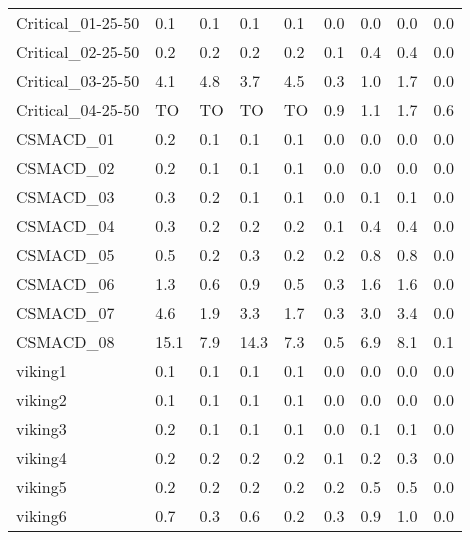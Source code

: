 \begin{table}
\begin{adjustbox}{max totalheight=\textheight}
\begin{tabular}{|l|llllllll|}
    Critical\_01-25-50 & 0.1      & 0.1      & 0.1      & 0.1      & 0.0      & 0.0      & 0.0      & 0.0    \\
    Critical\_02-25-50 & 0.2      & 0.2      & 0.2      & 0.2      & 0.1      & 0.4      & 0.4      & 0.0    \\
    Critical\_03-25-50 & 4.1      & 4.8      & 3.7      & 4.5      & 0.3      & 1.0      & 1.7      & 0.0    \\
    Critical\_04-25-50 & TO       & TO       & TO       & TO       & 0.9      & 1.1      & 1.7      & 0.6    \\ \hline
    CSMACD\_01         & 0.2      & 0.1      & 0.1      & 0.1      & 0.0      & 0.0      & 0.0      & 0.0    \\
    CSMACD\_02         & 0.2      & 0.1      & 0.1      & 0.1      & 0.0      & 0.0      & 0.0      & 0.0    \\
    CSMACD\_03         & 0.3      & 0.2      & 0.1      & 0.1      & 0.0      & 0.1      & 0.1      & 0.0    \\
    CSMACD\_04         & 0.3      & 0.2      & 0.2      & 0.2      & 0.1      & 0.4      & 0.4      & 0.0    \\
    CSMACD\_05         & 0.5      & 0.2      & 0.3      & 0.2      & 0.2      & 0.8      & 0.8      & 0.0    \\
    CSMACD\_06         & 1.3      & 0.6      & 0.9      & 0.5      & 0.3      & 1.6      & 1.6      & 0.0    \\
    CSMACD\_07         & 4.6      & 1.9      & 3.3      & 1.7      & 0.3      & 3.0      & 3.4      & 0.0    \\
    CSMACD\_08         & 15.1     & 7.9      & 14.3     & 7.3      & 0.5      & 6.9      & 8.1      & 0.1    \\ \hline
    viking1            & 0.1      & 0.1      & 0.1      & 0.1      & 0.0      & 0.0      & 0.0      & 0.0    \\
    viking2            & 0.1      & 0.1      & 0.1      & 0.1      & 0.0      & 0.0      & 0.0      & 0.0    \\
    viking3            & 0.2      & 0.1      & 0.1      & 0.1      & 0.0      & 0.1      & 0.1      & 0.0    \\
    viking4            & 0.2      & 0.2      & 0.2      & 0.2      & 0.1      & 0.2      & 0.3      & 0.0    \\
    viking5            & 0.2      & 0.2      & 0.2      & 0.2      & 0.2      & 0.5      & 0.5      & 0.0    \\
    viking6            & 0.7      & 0.3      & 0.6      & 0.2      & 0.3      & 0.9      & 1.0      & 0.0    \\

\end{tabular}
\end{adjustbox}
\end{table}
